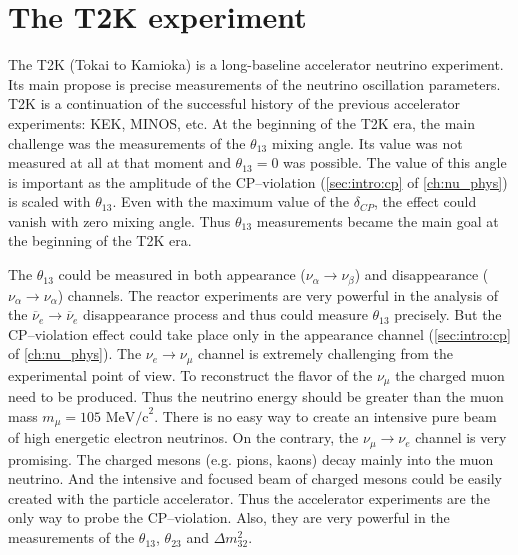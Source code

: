 \documentclass[../main.tex]{subfiles}
\begin{document}
\renewcommand{\labelitemi}{\ding{226}}
\renewcommand{\labelitemii}{\ding{227}}

\chapter{The T2K experiment}
\label{ch:T2K:general}

The T2K (Tokai to Kamioka) is a long-baseline accelerator neutrino experiment. Its main propose is precise measurements of the neutrino oscillation parameters. T2K is a continuation of the successful history of the previous accelerator experiments: KEK, MINOS, etc. At the beginning of the T2K era, the main challenge was the measurements of the $\theta_{13}$ mixing angle. Its value was not measured at all at that moment and $\theta_{13}=0$ was possible. The value of this angle is important as the amplitude of the CP--violation (\autoref{sec:intro:cp} of \autoref{ch:nu_phys}) is scaled with $\theta_{13}$. Even with the maximum value of the $\delta_{CP}$, the effect could vanish with zero mixing angle. Thus $\theta_{13}$ measurements became the main goal at the beginning of the T2K era.

The $\theta_{13}$ could be measured in both appearance ($\nu_\alpha\to\nu_\beta$) and disappearance ($\nu_\alpha\to\nu_\alpha$) channels. The reactor experiments are very powerful in the analysis of the $\overline{\nu}_e\to\overline{\nu}_e$ disappearance process and thus could measure $\theta_{13}$ precisely. But the CP--violation effect could take place only in the appearance channel (\autoref{sec:intro:cp} of \autoref{ch:nu_phys}). The $\nu_e\to\nu_\mu$ channel is extremely challenging from the experimental point of view. To reconstruct the flavor of the $\nu_\mu$ the charged muon need to be produced. Thus the neutrino energy should be greater than the muon mass $m_\mu=105\text{ MeV/c}^2$. There is no easy way to create an intensive pure beam of high energetic electron neutrinos. On the contrary, the $\nu_\mu\to\nu_e$ channel is very promising. The charged mesons (e.g. pions, kaons) decay mainly into the muon neutrino. And the intensive and focused beam of charged mesons could be easily created with the particle accelerator. Thus the accelerator experiments are the only way to probe the CP--violation. Also, they are very powerful in the measurements of the $\theta_{13}$, $\theta_{23}$ and $\Delta m^2_{32}.$
\end{document}
